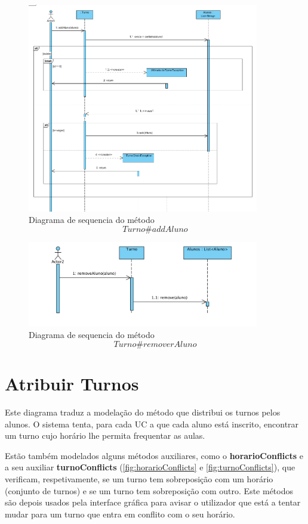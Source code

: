\documentclass[12pt,a4paper]{report}
\begin{document}
\begin{figure}[H]
	\centering 
	\includegraphics[width=0.9\textwidth]{modelacao/diagramas_de_sequencia/realizarTroca/addAluno.png}  
	\caption{Diagrama de sequencia do método $$Turno\#addAluno$$}
	\label{fig:addAluno}
\end{figure}
\begin{figure}[H]
	\centering 
	\includegraphics[width=0.9\textwidth]{modelacao/diagramas_de_sequencia/realizarTroca/removerAluno.png}
	\caption{Diagrama de sequencia do método $$Turno\#removerAluno$$}
	\label{fig:removeAluno}
\end{figure}

\section{Atribuir Turnos}
Este diagrama traduz a modelação do método que distribui os turnos pelos alunos.
O sistema tenta, para cada UC a que cada aluno está inscrito, encontrar um turno cujo horário lhe permita frequentar as aulas.

Estão também modelados alguns métodos auxiliares, como o \textbf{horarioConflicts} e a seu auxiliar \textbf{turnoConflicts} (\ref{fig:horarioConflicts} e \ref{fig:turnoConflicts}), que verificam, respetivamente, se um turno tem sobreposição com um horário (conjunto de turnos) e se um turno tem sobreposição com outro.
Este métodos são depois usados pela interface gráfica para avisar o utilizador que está a tentar mudar para um turno que entra em conflito com o seu horário.
\end{document}
